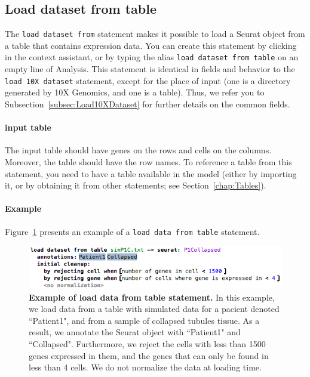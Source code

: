 \subsection{Load dataset from table}
The \texttt{load dataset from} statement makes it possible to load a Seurat object from a
table that contains expression data. You can create this statement by clicking
 in the context assistant, or by typing
the alias \texttt{load dataset from table} on an empty line of Analysis. This statement
is identical in fields and behavior to the \texttt{load 10X dataset} statement, except
for the place of input (one is a directory generated by 10X Genomics, and one is a table).
Thus, we refer you to Subsection~\ref{subsec:Load10XDataset} for further details on the common fields.

\paragraph{input table}
The input table should have genes on the rows and cells on the columns.
Moreover, the table should have the row names. To reference a table
from this statement, you need to have a table available in the model (either by importing
it, or by obtaining it from other statements; see Section~\ref{chap:Tables}).

\paragraph{Example} Figure~\ref{fig:ExampleLoadTable} presents an example of a
\texttt{load data from table} statement.

\begin{figure}[h!tbp]
  \centering
  \includegraphics[width=\figWidthWide]{figures/ExampleLoadTable.png}
    \caption[Example of load data from table statement.]{\textbf{Example of load data from table statement.}
    In this example, we load data from a table with simulated data for a pacient
    denoted ``Patient1", and from a sample of collapsed tubules tissue.
    As a result, we annotate the Seurat object with ``Patient1" and
    ``Collapsed". Furthermore, we reject the cells with less than 1500 genes expressed in
    them, and the genes that can only be found in less than 4 cells. We do not normalize
    the data at loading time.} 
\label{fig:ExampleLoadTable}
\end{figure}

